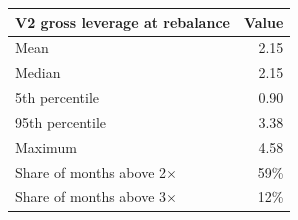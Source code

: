 \begin{tabular}{lr}
\toprule
V2 gross leverage at rebalance & Value \\
\midrule
Mean & 2.15 \\
Median & 2.15 \\
5th percentile & 0.90 \\
95th percentile & 3.38 \\
Maximum & 4.58 \\
Share of months above 2$\times$ & 59\% \\
Share of months above 3$\times$ & 12\% \\
\bottomrule
\end{tabular}
